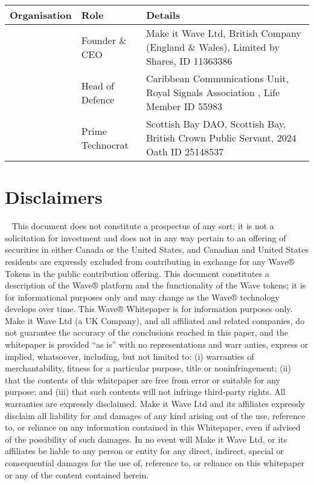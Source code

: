 \documentclass[letterpaper,10pt,english]{sphinxmanual}
\begin{document}
\begin{savenotes}\sphinxattablestart
\centering
\begin{tabulary}{\linewidth}[t]{|T|T|T|}
\hline
\sphinxstyletheadfamily 
Organisation
&\sphinxstyletheadfamily 
Role
&\sphinxstyletheadfamily 
Details
\\
\hline
\noindent{}
&
Founder \& CEO
&
Make it Wave Ltd, British Company (England \& Wales), Limited by Shares, ID 11363386
\\
\hline
\noindent{}
&
Head of Defence
&
Caribbean Communications Unit, Royal Signals Association , Life Member ID 55983
\\
\hline
\noindent{}
&
Prime Technocrat
&
Scottish Bay DAO, Scottish Bay, British Crown Public Servant, 2024 Oath ID 25148537
\\
\hline
\end{tabulary}
\par
\sphinxattableend\end{savenotes}


\section{Disclaimers}
\label{\detokenize{index:disclaimers}}
  This document does not constitute a prospectus of any sort; it is not a solicitation for investment and does not in any way pertain to an offering of securities in either Canada or the United States, and Canadian and United States residents are expressly excluded from contributing in exchange for any Wave® Tokens in the public contribution offering. This document constitutes a description of the Wave® platform and the functionality of the Wave tokens; it is for informational purposes only and may change as the Wave® technology develops over time. This Wave® Whitepaper is for information purposes only. Make it Wave Ltd (a UK Company), and all affiliated and related companies, do not guarantee the accuracy of the conclusions reached in this paper, and the whitepaper is provided “as is” with no representations and warr anties, express or implied, whatsoever, including, but not limited to: (i) warranties of merchantability, fitness for a particular purpose, title or noninfringement; (ii) that the contents of this whitepaper are free from error or suitable for any purpose; and (iii) that such contents will not infringe third-party rights. All warranties are expressly disclaimed. Make it Wave Ltd and its affiliates expressly disclaim all liability for and damages of any kind arising out of the use, reference to, or reliance on any information contained in this Whitepaper, even if advised of the possibility of such damages. In no event will Make it Wave Ltd, or its affiliates be liable to any person or entity for any direct, indirect, special or consequential damages for the use of, reference to, or reliance on this whitepaper or any of the content contained herein.
\end{document}

